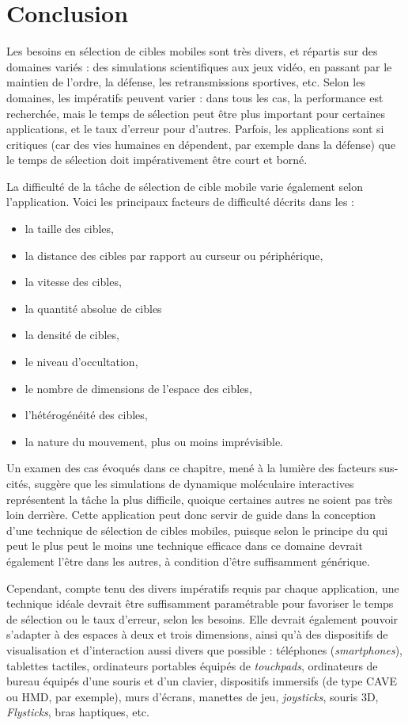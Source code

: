 	
	\section{Conclusion}    
	Les besoins en sélection de cibles mobiles sont très divers, et répartis sur des domaines variés : des simulations scientifiques aux jeux vidéo, en passant par le maintien de l'ordre, la défense, les retransmissions sportives, etc. Selon les domaines, les impératifs peuvent varier : dans tous les cas, la performance est recherchée, mais le temps de sélection peut être plus important pour certaines applications, et le taux d'erreur pour d'autres. Parfois, les applications sont si critiques (car des vies humaines en dépendent, par exemple dans la défense) que le temps de sélection doit impérativement être court et borné.
	
	La difficulté de la tâche de sélection de cible mobile varie également selon l'application. Voici les principaux facteurs de difficulté décrits dans les  :
	\begin{itemize}
		\item la taille des cibles,
		\item la distance des cibles par rapport au \og curseur \fg{} ou périphérique,
		\item la vitesse des cibles,
		\item la quantité absolue de cibles
		\item la densité de cibles,
		\item le niveau d'occultation,
		\item le nombre de dimensions de l'espace des cibles,
		\item l'hétérogénéité des cibles,
		\item la nature du mouvement, plus ou moins imprévisible.
	\end{itemize}
	
	Un examen des cas évoqués dans ce chapitre, mené à la lumière des facteurs sus-cités, suggère que les simulations de dynamique moléculaire interactives représentent la tâche la plus difficile, quoique certaines autres ne soient pas très loin derrière. Cette application peut donc servir de guide dans la conception d'une technique de sélection de cibles mobiles, puisque selon le principe du \og qui peut le plus peut le moins \fg{} une technique efficace dans ce domaine devrait également l'être dans les autres, à condition d'être suffisamment générique.
	
	Cependant, compte tenu des divers impératifs requis par chaque application, une technique idéale devrait être suffisamment paramétrable pour favoriser le temps de sélection ou le taux d'erreur, selon les besoins. Elle devrait également pouvoir s'adapter à des espaces à deux et trois dimensions, ainsi qu'à des dispositifs de visualisation et d'interaction aussi divers que possible : téléphones (\emph{smartphones}), tablettes tactiles, ordinateurs portables équipés de \emph{touchpads}, ordinateurs de bureau équipés d'une souris et d'un clavier, dispositifs immersifs (de type CAVE ou HMD, par exemple), murs d'écrans, manettes de jeu, \emph{joysticks}, souris 3D, \emph{Flysticks}\footnotemark, bras haptiques, etc.
	
